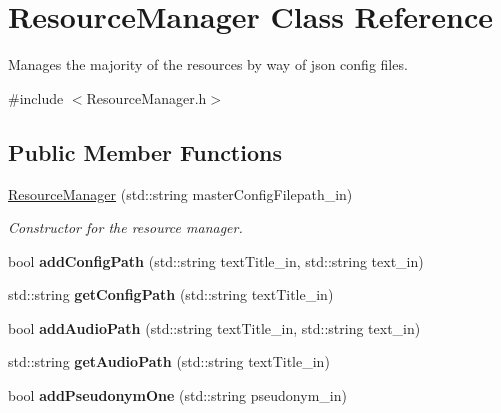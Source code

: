 \hypertarget{class_resource_manager}{}\section{Resource\+Manager Class Reference}
\label{class_resource_manager}


Manages the majority of the resources by way of json config files.  




{\ttfamily \#include $<$Resource\+Manager.\+h$>$}

\subsection*{Public Member Functions}
\begin{DoxyCompactItemize}
\item 
\hyperlink{class_resource_manager_adad08cf28525bce25c672e985c3d092a}{Resource\+Manager} (std\+::string master\+Config\+Filepath\+\_\+in)
\begin{DoxyCompactList}\small\item\em Constructor for the resource manager. \end{DoxyCompactList}\item 
\mbox{\label{class_resource_manager_a38503330be0ec9c97d30136bede61184}} 
bool {\bfseries add\+Config\+Path} (std\+::string text\+Title\+\_\+in, std\+::string text\+\_\+in)
\item 
\mbox{\label{class_resource_manager_a3dac9daf02e548da92054449d257facf}} 
std\+::string {\bfseries get\+Config\+Path} (std\+::string text\+Title\+\_\+in)
\item 
\mbox{\label{class_resource_manager_a0be21bd43ef77c25f9d2107a0f2df717}} 
bool {\bfseries add\+Audio\+Path} (std\+::string text\+Title\+\_\+in, std\+::string text\+\_\+in)
\item 
\mbox{\label{class_resource_manager_a786947e8a7e35587b39d00871597c8b0}} 
std\+::string {\bfseries get\+Audio\+Path} (std\+::string text\+Title\+\_\+in)
\item 
\mbox{\label{class_resource_manager_adbfa7683d6497f502b6be5eef2fe9d39}} 
bool {\bfseries add\+Pseudonym\+One} (std\+::string pseudonym\+\_\+in)

\end{DoxyCompactItemize}
